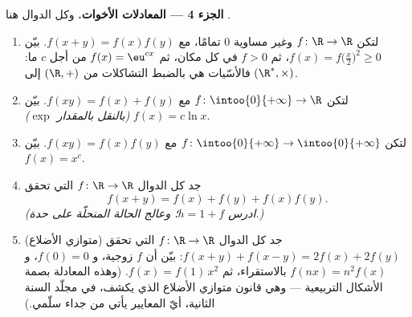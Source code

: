 \begin{problem}[{مسألة نهاية الأسبوع --- $f(x + y) = f(x) + f(y)$:
الانتظام يفرض الخطية، وصورة الوحوش}]
\medskip
\noindent\textbf{الجزء 4 --- المعادلات الأخوات.} وكل
الدوال هنا .
\begin{enumerate}[resume]
  \item لتكن $f \colon \R \to \R$  وغير مساوية $0$
        تمامًا، مع $f(x + y) = f(x)f(y)$. بيّن $f(x) =
        f\bigl(\frac x2\bigr)^2 \geq 0$، ثم $f > 0$ في كل مكان،
        ثم $f(x) = \eu^{cx}$ من أجل $c$ ما: فالأسّيات
        هي بالضبط التشاكلات  من $(\R, +)$ إلى
        $(\R^*, \times)$.
  \item لتكن $f \colon \intoo{0}{+\infty} \to \R$ 
        مع $f(xy) = f(x) + f(y)$. بيّن $f(x) = c\ln x$
        \emph{(بالنقل بالمقدار $\exp$)}.
  \item لتكن $f \colon \intoo{0}{+\infty} \to \intoo{0}{+\infty}$
         مع $f(xy) = f(x)f(y)$. بيّن $f(x) = x^c$.
  \item جد كل الدوال  $f \colon \R \to \R$ التي تحقق
        \[
        f(x + y) = f(x) + f(y) + f(x)f(y) .
        \]
        \emph{(ادرس $h = 1 + f$؛ وعالج الحالة المنحلّة
        على حدة.)}
  \item (متوازي الأضلاع) جد كل الدوال  $f \colon \R \to \R$
        التي تحقق $f(x + y) + f(x - y) = 2f(x) + 2f(y)$: بيّن أن $f$
        زوجية، و $f(0) = 0$، و $f(nx) = n^2 f(x)$ بالاستقراء، ثم
        $f(x) = f(1)\,x^2$. (وهذه المعادلة بصمة
        الأشكال التربيعية --- وهي قانون متوازي الأضلاع الذي يكشف،
        في مجلّد السنة الثانية، أيّ المعايير يأتي من جداء
        سلّمي.)
\end{enumerate}


\end{problem}
